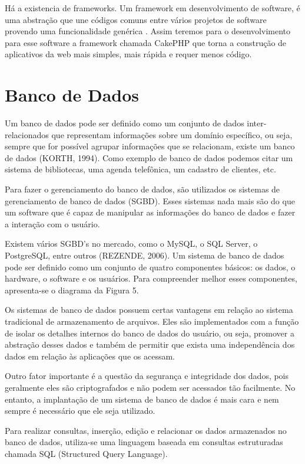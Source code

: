 Há a existencia de frameworks. Um framework em desenvolvimento de software, é uma abstração que une códigos comuns entre vários projetos de software provendo uma funcionalidade genérica \cite{WEB3}. Assim teremos para o desenvolvimento para esse software a framework chamada CakePHP \cite{Cake} que  torna a construção de aplicativos da web mais simples, mais rápida e requer menos código. 

\section[Banco de Dados]{Banco de Dados}
Um banco de dados pode ser definido como um conjunto de dados inter-relacionados que representam informações sobre um domínio específico, ou seja, sempre que for possível agrupar informações que se relacionam, existe um banco de dados (KORTH, 1994). Como exemplo de banco de dados podemos citar um sistema de bibliotecas, uma agenda telefônica, um cadastro de clientes, etc.

Para fazer o gerenciamento do banco de dados, são utilizados os sistemas de gerenciamento de banco de dados (SGBD). Esses sistemas nada mais são do que um software que é capaz de manipular as informações do banco de dados e fazer a interação com o usuário.

Existem vários SGBD’s no mercado, como o MySQL, o SQL Server, o PostgreSQL, entre outros (REZENDE, 2006).
Um sistema de banco de dados pode ser definido como um conjunto de quatro componentes básicos: os dados, o hardware, o software e os usuários. Para compreender melhor esses componentes, apresenta-se o diagrama da Figura 5.

Os sistemas de banco de dados possuem certas vantagens em relação ao sistema tradicional de armazenamento de arquivos. Eles são implementados com a função de isolar os detalhes internos do banco de dados do usuário, ou seja, promover a abstração desses dados e também de permitir que exista uma independência dos dados em relação às aplicações que os
acessam. 

Outro fator importante é a questão da segurança e integridade dos dados, pois geralmente eles são criptografados e não podem ser acessados tão facilmente. No entanto, a implantação de um sistema de banco de dados é mais cara e nem sempre é necessário que ele seja utilizado.

Para realizar consultas, inserção, edição e relacionar os dados armazenados no banco de dados, utiliza-se uma linguagem baseada em consultas estruturadas chamada SQL (Structured Query Language).

